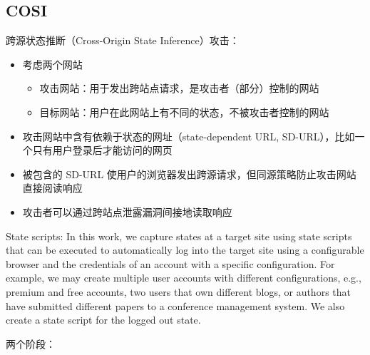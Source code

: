 \subsection{COSI}

跨源状态推断（Cross-Origin State Inference）攻击\cite{cosi}：

\begin{itemize}
    \item 考虑两个网站
    \begin{itemize}
        \item 攻击网站：用于发出跨站点请求，是攻击者（部分）控制的网站
        \item 目标网站：用户在此网站上有不同的状态，不被攻击者控制的网站
    \end{itemize}
    \item 攻击网站中含有依赖于状态的网址（state-dependent URL, SD-URL），比如一个只有用户登录后才能访问的网页
    \item 被包含的 SD-URL 使用户的浏览器发出跨源请求，但同源策略防止攻击网站直接阅读响应
    \item 攻击者可以通过跨站点泄露漏洞间接地读取响应
\end{itemize}

State scripts: In this work, we capture states at a target site using state scripts that can be executed to automatically log into the target site using a configurable browser and the credentials of an account with a specific configuration. For example, we may create multiple user accounts with different configurations, e.g., premium and free accounts, two users that own different blogs, or authors that have submitted different papers to a conference management system. We also create a state script for the logged out state.

两个阶段：

